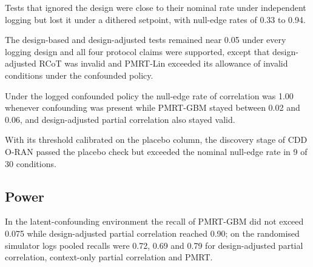Tests that ignored the design were close to their nominal rate under independent logging but lost it under a dithered setpoint, with null-edge rates of 0.33 to 0.94.

The design-based and design-adjusted tests remained near 0.05 under every logging design and all four protocol claims were supported, except that design-adjusted RCoT was invalid and PMRT-Lin exceeded its allowance of invalid conditions under the confounded policy.

Under the logged confounded policy the null-edge rate of correlation was 1.00 whenever confounding was present while PMRT-GBM stayed between 0.02 and 0.06, and design-adjusted partial correlation also stayed valid.

With its threshold calibrated on the placebo column, the discovery stage of CDD O-RAN passed the placebo check but exceeded the nominal null-edge rate in 9 of 30 conditions.

\subsection{Power}
\label{spec:env.power}

In the latent-confounding environment the recall of PMRT-GBM did not exceed 0.075 while design-adjusted partial correlation reached 0.90; on the randomised simulator logs pooled recalls were 0.72, 0.69 and 0.79 for design-adjusted partial correlation, context-only partial correlation and PMRT.
